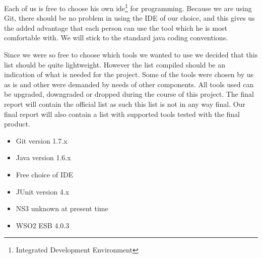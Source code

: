     Each of us is free to choose his own \gls{ide}\footnote{Integrated Development Environment} for programming. Because we are using Git, there should be no problem in using the IDE of our choice, and this gives us the added advantage that each person can use the tool which he is most comfortable with. We will stick to the standard \gls{java coding conventions}.
    
    Since we were so free to choose which tools we wanted to use we decided that this list should be quite lightweight. However the list compiled should be an indication of what is needed for the project. Some of the tools were chosen by us as is and other were demanded by needs of other components. All tools used can be  upgraded, downgraded or dropped during the course of this project. The final report will contain the official list as such this list is not in any way final. Our final report will also contain a list with supported tools tested with the final product.
    \begin{itemize}
        \item Git version 1.7.x
        \item Java version 1.6.x
        \item Free choice of IDE
        \item JUnit version 4.x
        \item NS3 unknown at present time
        \item WSO2 ESB 4.0.3
    \end{itemize}
    

